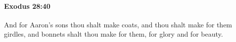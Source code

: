 
		\paragraph{Exodus 28:40} %
			\label{EXODUS-28-40}

			And for Aaron's sons thou shalt make coats, and thou shalt make for them girdles, and bonnets shalt thou make for them, for glory and for beauty.


